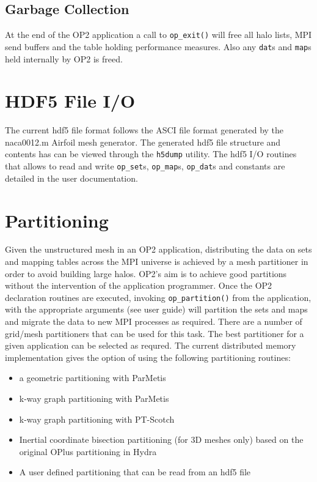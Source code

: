 \documentclass[11pt]{article}
\begin{document}
\subsection{Garbage Collection}\label{subsec/cleanup}
At the end of the OP2 application a call to \texttt{op\_exit()} will free all halo lists, MPI send buffers and the table
holding performance measures. Also any \texttt{dat}s and \texttt{map}s held internally by OP2 is freed.

\section{HDF5 File I/O}\label{sec/hdf5}
The current hdf5 file format follows the ASCI file format generated by the naca0012.m Airfoil mesh generator. The
generated hdf5 file structure and contents has can be viewed through the \texttt{h5dump} utility.  The hdf5 I/O routines
that allows to read and write \texttt{op\_set}s, \texttt{op\_map}s, \texttt{op\_dat}s and constants are detailed in the
user documentation.






\newpage
\section{Partitioning}\label{sec/partitioning}
Given the unstructured mesh in an OP2 application, distributing the data on sets and mapping tables across the MPI
universe is achieved by a mesh partitioner in order to avoid building large halos. OP2's aim is to achieve good
partitions without the intervention of the application programmer. Once the OP2 declaration routines are executed,
invoking \texttt{op\_partition()} from the application, with the appropriate arguments (see user guide) will partition
the sets and maps and migrate the data to new MPI processes as required. There are a number of grid/mesh partitioners
that can be used for this task.  The best partitioner for a given application can be selected as requred. The
current distributed memory implementation gives the option of using the following partitioning routines:
\begin{itemize}
\item a geometric partitioning with ParMetis~\cite{ParMETIS}
\item k-way graph partitioning with ParMetis~\cite{ParMETIS}
\item k-way graph partitioning with PT-Scotch~\cite{PTScotch}
\item Inertial coordinate bisection partitioning (for 3D meshes only) based on the original OPlus partitioning in Hydra
\item A user defined partitioning that can be read from an hdf5 file
\end{itemize}
\end{document}
